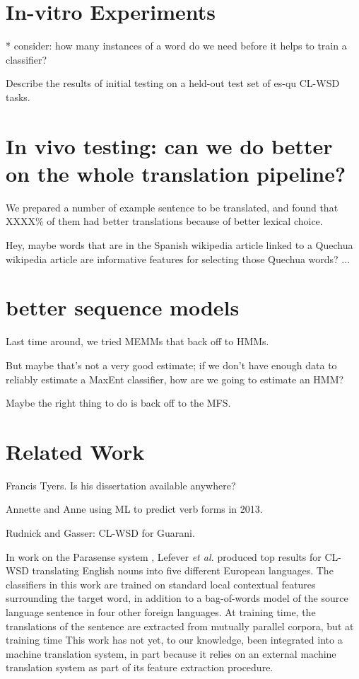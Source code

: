 \documentclass[10pt, a4paper]{article}
\begin{document}
\section{In-vitro Experiments}
* consider: how many instances of a word do we need before it helps to train a
classifier?


Describe the results of initial testing on a held-out test set of es-qu CL-WSD
tasks.


\section{In vivo testing: can we do better on the whole translation pipeline?}


We prepared a number of example sentence to be translated, and found that
XXXX\% of them had better translations because of better lexical choice.


Hey, maybe words that are in the Spanish wikipedia article linked to a Quechua
wikipedia article are informative features for selecting those Quechua words?
...


\section{better sequence models}
Last time around, we tried MEMMs that back off to HMMs.


But maybe that's not a very good estimate; if we don't have enough data to
reliably estimate a MaxEnt classifier, how are we going to estimate an HMM?


Maybe the right thing to do is back off to the MFS.


\section{Related Work}
Francis Tyers. Is his dissertation available anywhere?
\cite{tyers-dissertation}

Annette and Anne
using ML to predict verb forms in 2013.
\cite{riosgonzales-gohring:2013:HyTra}

Rudnick and Gasser: CL-WSD for Guarani.

In work on the Parasense system \cite{lefever-hoste-decock:2011:ACL-HLT2011},
Lefever \emph{et al.} produced top results for CL-WSD translating English nouns
into five different European languages. The classifiers in this work are
trained on standard local contextual features surrounding the target word,
in addition to a bag-of-words model of the source language sentence in four
other foreign languages. At training time, the translations of the sentence are
extracted from mutually parallel corpora, %
but at training time
This work has not yet, to our knowledge, been integrated into a machine
translation system, in part because it relies on an external machine
translation system as part of its feature extraction procedure.
\end{document}
